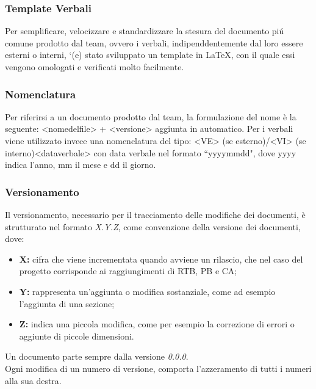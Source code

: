 \subsubsection{Template Verbali}
Per semplificare, velocizzare e standardizzare la stesura del documento piú comune prodotto dal team, ovvero i verbali, indipenddentemente dal loro essere esterni o interni, `(e) stato sviluppato un template in \LaTeX, con il quale essi vengono omologati e verificati molto facilmente.

\subsubsection{Nomenclatura}
Per riferirsi a un documento prodotto dal team, la formulazione del nome è la seguente: <nome\textunderscore del\textunderscore file> + <versione> aggiunta in automatico. Per i verbali viene utilizzato invece una nomenclatura del tipo: <VE> (se esterno)/<VI> (se interno)\textunderscore <data\textunderscore verbale> con data verbale nel formato ``yyyy\textunderscore mm\textunderscore dd", dove yyyy indica l'anno, mm il mese e dd il giorno. 

\subsubsection{Versionamento}
Il versionamento, necessario per il tracciamento delle modifiche dei documenti, è strutturato nel formato \textit{X.Y.Z}, come convenzione della versione dei documenti, dove:
\begin{itemize}
    \item \textbf{X:} cifra che viene incrementata quando avviene un rilascio, che nel caso del progetto corrisponde ai raggiungimenti di RTB, PB e CA;
    \item \textbf{Y:} rappresenta un'aggiunta o modifica sostanziale, come ad esempio l'aggiunta di una sezione;
    \item \textbf{Z:} indica una piccola modifica, come per esempio la correzione di errori o aggiunte di piccole dimensioni.
\end{itemize}
Un documento parte sempre dalla versione \textit{0.0.0}. \\
Ogni modifica di un numero di versione, comporta l'azzeramento di tutti i numeri alla sua destra.

